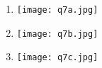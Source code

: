 \newpage 

\begin{question}
  
    \begin{enumerate}[label=\textbf{\alph*})]
        \item 
        \begin{minipage}{\textwidth}
            \centering 
            \texttt{[image: q7a.jpg]}
        \end{minipage}
        \item 
        \begin{minipage}{\textwidth}
            \centering 
            \texttt{[image: q7b.jpg]}
        \end{minipage}
        \item 
        \begin{minipage}{\textwidth}
            \centering 
            \texttt{[image: q7c.jpg]}
        \end{minipage}

    \end{enumerate}


\end{question}

